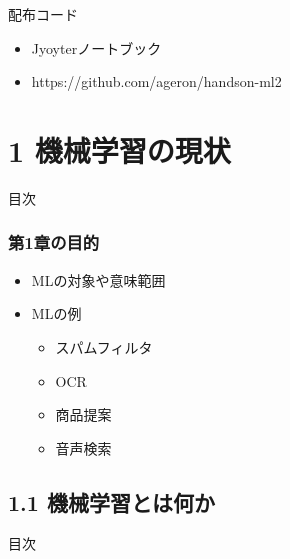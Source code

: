 \documentclass[aspectratio=169, dvipdfmx, 14pt, xcolor={svgnames,dvipsnames}]{beamer}
\def\tightlist{\itemsep1pt\parskip0pt\parsep0pt}
\begin{document}
\begin{frame}{配布コード}
  \begin{itemize}
    \tightlist
    \item
          Jyoyterノートブック
    \item
          https://github.com/ageron/handson-ml2
  \end{itemize}
\end{frame}


\section{1
  機械学習の現状}\label{ux6a5fux68b0ux5b66ux7fd2ux306eux73feux72b6}

\begin{frame}{目次}
  \tableofcontents[currentsection]
\end{frame}


\begin{frame}
  \frametitle{第1章の目的}

  \begin{itemize}
    \tightlist
    \item
          MLの対象や意味範囲
    \item
          MLの例

          \begin{itemize}
            \tightlist
            \item
                  スパムフィルタ
            \item
                  OCR
            \item
                  商品提案
            \item
                  音声検索
          \end{itemize}
  \end{itemize}
\end{frame}


\subsection{1.1
  機械学習とは何か}\label{ux6a5fux68b0ux5b66ux7fd2ux3068ux306fux4f55ux304b}

\begin{frame}{目次}
  \tableofcontents[currentsubsection]
\end{frame}
\end{document}
